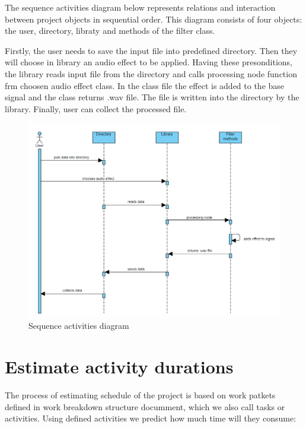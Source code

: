 \documentclass[12pt]{article}
\begin{document}
	The sequence activities diagram below represents relations and interaction between project objects in sequential order. This diagram consists of four objects: the user, directory, libraty and methods of the filter class.
	
	Firstly, the user needs to save the input file into predefined directory. Then they will choose in library an audio effect to be applied. Having these presonditions, the library reads input file from the directory and calls processing node function frm choosen audio effect class. In the class file the effect is added to the base signal and the class returns .wav file. The file is written into the directory by the library. Finally, user can collect the processed file.
	
	\begin{figure}[H]
		\includegraphics[width=1\textwidth, center]{Sequence activities diagram}
		\caption{Sequence activities diagram}
	\end{figure}

\section{Estimate activity durations}

	The process of estimating schedule of the project is based on work patkets defined in work breakdown structure documment, which we also call tasks or activities. Using defined activities we predict how much time will they consume:
	
\end{document}
